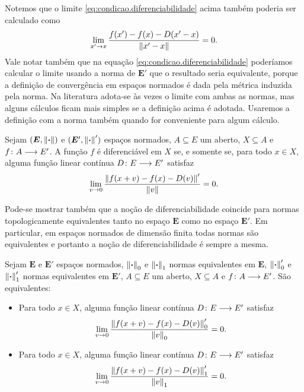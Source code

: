 Notemos que o limite \ref{eq:condicao.diferenciabilidade} acima também poderia ser calculado como
	\begin{equation*}
	\lim_{x' \to x} \frac{f(x') - f(x) - D(x'-x)}{\left\Vert{x'-x}\right\Vert} = 0.
	\end{equation*}
Vale notar também que na equação \ref{eq:condicao.diferenciabilidade} poderíamos calcular o limite usando a norma de $\bm E'$ que o resultado seria equivalente, porque a definição de convergência em espaços normados é dada pela métrica induzida pela norma. Na literatura adota-se às vezes o limite com ambas as normas, mas alguns cálculos ficam mais simples se a definição acima é adotada. Usaremos a definição com a norma também quando for conveniente para algum cálculo.

\begin{exercise}
Sejam $(\bm E,\left\Vert{\bm{\cdot}}\right\Vert)$ e $(\bm E',\left\Vert{\bm{\cdot}}\right\Vert')$ espaços normados, $A \subseteq E$ um aberto, $X \subseteq A$ e $f\colon \allowbreak A \longrightarrow E'$. A função $f$ é diferenciável em $X$ se, e somente se, para todo $x \in X$, alguma função linear contínua $D\colon \allowbreak E \longrightarrow E'$ satisfaz
	\begin{equation*}
	\lim_{v \to 0} \frac{\left\Vert{f(x+v) - f(x) - D(v)}\right\Vert'}{\left\Vert{v}\right\Vert} = 0.
	\end{equation*}
\end{exercise}

Pode-se mostrar também que a noção de diferenciabilidade coincide para normas topologicamente equivalentes tanto no espaço $\bm E$ como no espaço $\bm E'$. Em particular, em espaços normados de dimensão finita todas normas são equivalentes e portanto a noção de diferenciabilidade é sempre a mesma.

\begin{exercise}
\label{prop:equivalencia.norma.diferenciacao}
Sejam $\bm E$ e $\bm E'$ espaços normados, $\left\Vert{\bm{\cdot}}\right\Vert_0$ e $\left\Vert{\bm{\cdot}}\right\Vert_1$ normas equivalentes em $\bm E$, $\left\Vert{\bm{\cdot}}\right\Vert'_0$ e $\left\Vert{\bm{\cdot}}\right\Vert'_1$ normas equivalentes em $\bm E'$, $A \subseteq E$ um aberto, $X \subseteq A$ e $f\colon \allowbreak A \longrightarrow E'$. São equivalentes:
	\begin{itemize}
	\item Para todo $x \in X$, alguma função linear contínua $D\colon \allowbreak E \longrightarrow E'$ satisfaz
		\begin{equation*}
		\lim_{v \to 0} \frac{\left\Vert{f(x+v) - f(x) - D(v)}\right\Vert'_0}{\left\Vert{v}\right\Vert_0} = 0.
		\end{equation*}
	\item Para todo $x \in X$, alguma função linear contínua $D\colon \allowbreak E \longrightarrow E'$ satisfaz
		\begin{equation*}
		\lim_{v \to 0} \frac{\left\Vert{f(x+v) - f(x) - D(v)}\right\Vert'_1}{\left\Vert{v}\right\Vert_1} = 0.
		\end{equation*}
	\end{itemize}
\end{exercise}

